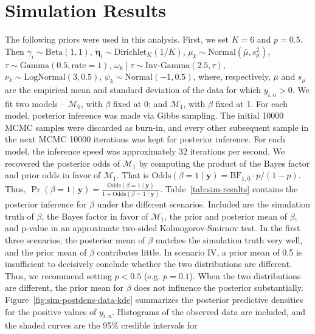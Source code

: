 \documentclass[12pt]{article} %
\newcommand{\Normal}{\text{Normal}}
\newcommand{\Beta}{\text{Beta}}
\newcommand{\G}{\text{Gamma}}
\newcommand{\InvGamma}{\text{Inv-Gamma}}
\newcommand{\Dirichlet}{\text{Dirichlet}}
\newcommand{\LogNormal}{\text{LogNormal}}
\begin{document}
\section{Simulation Results}\label{sec:sim-results}
The following priors were used in this analysis. First, we set $K=6$ and
$p=0.5$. Then $\gamma_i\sim\Beta(1, 1)$, $\bm\eta_i\sim\Dirichlet_K(1/K)$,
$\mu_k\sim\Normal(\bar{\mu}, s_\mu^2)$, $\tau\sim\G(0.5,\text{rate}=1)$,
$\omega_k\mid\tau\sim\InvGamma(2.5, \tau)$, $\nu_k\sim\LogNormal(3, 0.5)$,
$\psi_k\sim\Normal(-1, 0.5)$, where,
respectively, $\bar{\mu}$ and $s_\mu$ are the empirical mean and standard
deviation of the data for which $y_{i,n} > 0$.
%
We fit two models -- $\mathcal{M}_0$, with $\beta$ fixed at 0; and
$\mathcal{M}_1$, with $\beta$ fixed at 1. For each model, posterior inference
was made via Gibbs sampling. The initial 10000 MCMC samples were discarded as
burn-in, and every other subsequent sample in the next MCMC 10000 iterations
was kept for posterior inference. For each model, the inference speed was
approximately 32 iterations per second. We recovered the posterior odds
of $\mathcal{M}_1$ by computing the product of the Bayes factor and prior
odds in favor of $\mathcal{M}_1$. That is $\text{Odds}(\beta=1 \mid \bm y) =
\text{BF}_{1,0} \cdot p/(1-p)$. Thus, $\Pr(\beta=1\mid\bm y) =
\frac{\text{Odds}(\beta=1 \mid \bm y)}{1 + \text{Odds}(\beta=1 \mid \bm y)}$.
%
%
Table~\ref{tab:sim-results} contains the posterior inference for $\beta$
under the different scenarios. Included are the simulation truth of $\beta$,
the Bayes factor in favor of $\mathcal{M}_1$, the prior and posterior mean of
$\beta$, and p-value in an approximate two-sided Kolmogorov-Smirnov test. In
the first three scenarios, the posterior mean of $\beta$ matches the
simulation truth very well, and the prior mean of $\beta$ contributes little.
In scenario IV, a prior mean of 0.5 is insufficient to decisively conclude
whether the two distributions are different. Thus, we recommend setting
$p<0.5$ (e.g. $p=0.1$). When the two distributions are different, the prior mean
for $\beta$ does not influence the posterior substantially.
%
Figure~\ref{fig:sim-postdens-data-kde} summarizes the posterior predictive
densities for the positive values of $y_{i,n}$. Histograms of the observed
data are included, and the shaded curves are the 95\% credible intervals for
\end{document}
